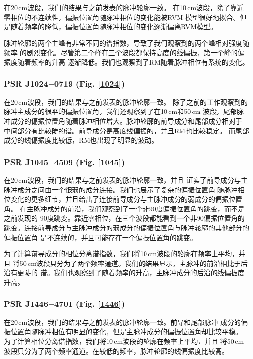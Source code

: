 在20\,cm波段，我们的结果与之前发表的脉冲轮廓一致\supercite{1022Kramer99,Stairs99,Ord04,Yan11a}。
在10\,cm波段，除了靠近零相位的不连续性，偏振位置角随脉冲相位的变化能被RVM
模型很好地拟合。但是随着频率的降低，偏振位置角随脉冲相位的变化逐渐偏离RVM模型。

脉冲轮廓的两个主峰有非常不同的谱指数，导致了我们观察到的两个峰相对强度随频率
的剧烈变化。尽管第二个峰在三个波段都保持高度的线偏振，第一个峰的偏振度随着频率的升高
逐渐降低。我们也观察到了RM随着脉冲相位有系统的变化。

\subsubsection{PSR J1024$-$0719 (Fig. \ref{1024})}

在20\,cm波段，我们的结果与之前发表的脉冲轮廓一致\supercite{Ord04,Yan11a}。
除了之前的工作观察到的脉冲主成分的很平的偏振位置角，我们还观察到了在10\,cm和50\,cm
波段，尾部脉冲成分的偏振位置角随着脉冲相位增大。脉冲轮廓的前导成分和尾部成分相对于
中间部分有比较陡的谱。前导成分是高度线偏振的，并且RM也比较稳定。
而尾部成分的线偏振度比较低，RM也出现了明显的波动。

\subsubsection{PSR J1045$-$4509 (Fig. \ref{1045})}

在20\,cm波段，我们的结果与之前发表的脉冲轮廓一致\supercite{Ord04,Yan11a}，并且
证实了前导成分与主脉冲成分之间由一个很弱的成分连接。我们也展示了复杂的偏振位置角
随脉冲相位变化的更多细节，并且给出了连接前导成分与主脉冲成分的弱成分的偏振位置角。
在主脉冲成分的前沿，我们观察到了一个非90度偏振位置角的跳变，而不是之前发现的
90度跳变\supercite{Yan11a}。靠近零相位，在三个波段都能看到一个非90偏振位置角的
跳变。连接前导成分与主脉冲成分的弱成分的偏振位置角与脉冲轮廓的其他部分的偏振位置角
是不连续的，并且可能存在一个偏振位置角的跳变。

为了计算前导成分的相位分离谱指数，我们将10\,cm波段的轮廓在频率上平均，并且
将50\,cm波段只分为了两个频率通道。我们的结果显示，主脉冲的前沿相比于后沿有更陡的
谱。我们也观察到了随着频率的升高，主脉冲成分的后沿的线偏振度升高。


\subsubsection{PSR J1446$-$4701 (Fig. \ref{1446})}

在20\,cm波段，我们的结果与之前发表的脉冲轮廓一致\supercite{Keith12}。前导和尾部脉冲
成分的偏振位置角随脉冲相位有明显的变化，但是主脉冲成分的偏振位置角却比较平稳。
为了计算相位分离谱指数，我们将10\,cm波段的轮廓在频率上平均，并且
将50\,cm波段只分为了两个频率通道。在较低的频率，脉冲轮廓的线偏振度比较高。

